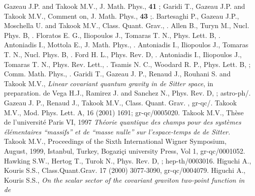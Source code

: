 \documentclass[a4paper,11pt,showpacs,preprintnumbers]{revtex4}
\begin{document}
\begin{thebibliography}{99}

 Gazeau J.P. and Takook M.V., J. Math.
Phys., {\bf 41} \coordHE{}; Garidi T., Gazeau J.P. and
Takook M.V., Comment on, J. Math. Phys., {\bf 43} \coordHE{};.
 Bartesaghi P., Gazeau J.P.,
Moschella U. and Takook M.V.,  Class. Quant. Grav., \coordHE{}  \coordHE{}.
  Allen B., Turyn M., Nucl. Phys. B,
\coordHE{}.
 Floratos E. G., Iliopoulos J.,
Tomaras T. N., Phys. Lett. B, \coordHE{}.
  Antoniadis I., Mottola  E., J. Math.
Phys.,  \coordHE{}.
  Antoniadis I., Iliopoulos  J.,
Tomaras T. N., Nucl. Phys. B, \coordHE{}.
 Ford H. L., Phys. Rev. D, \coordHE{}.
 Antoniadis I., Iliopoulos  J.,
Tomaras T. N., Phys.
Rev. Lett.,
 \coordHE{}.
  Tsamis N. C., Woodard R. P., Phys.
Lett. B, \coordHE{}; Comm. Math. Phys., \coordHE{}.
  Garidi T., Gazeau J. P., Renaud J.,
Rouhani S. and Takook M.V., {\it Linear covariant quantum gravity
in de Sitter space}, in preparation.
 de Vega H.J., Ramirez J. and Sanchez
N., Phys. Rev. D, \coordHE{};
 astro-ph/\coordHE{}.
  Gazeau J. P., Renaud J., Takook
M.V., Class. Quant. Grav. \coordHE{}, gr-qc/\coordHE{}.
  Takook M.V., Mod. Phys. Lett. A, 16 (2001) 1691;
gr-qc/0005020.
 Takook M.V., Th\`ese de l'universit\'e Paris VI, 1997
{\it Th\'eorie quantique des champs pour des syst\`emes
\'el\'ementaires ``massifs'' et de ``masse nulle'' sur
l'espace-temps de de Sitter.}  Takook M.V., Proceedings of the
Sixth International Wigner Symposium,  \coordHE{} August, 1999,
Istanbul, Turkey, Bogazi\c{c}i university Press, Vol 1,
gr-qc/0001052.
  Hawking S.W., Hertog T., Turok N.,
 Phys. Rev. D, \coordHE{}; hep-th/0003016.
  Higuchi A., Kouris S.S.,
Class.Quant.Grav. 17 (2000) 3077-3090, gr-qc/0004079.
  Higuchi A., Kouris S.S., {\it On the
scalar sector of the covariant graviton two-point function in de
}
\end{thebibliography}
\end{document}

